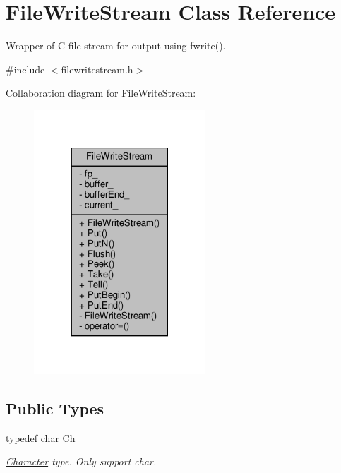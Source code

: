 \hypertarget{classFileWriteStream}{}\section{File\+Write\+Stream Class Reference}
\label{classFileWriteStream}


Wrapper of C file stream for output using fwrite().  




{\ttfamily \#include $<$filewritestream.\+h$>$}



Collaboration diagram for File\+Write\+Stream\+:
\nopagebreak
\begin{figure}[H]
\begin{center}
\leavevmode
\includegraphics[width=182pt]{classFileWriteStream__coll__graph}
\end{center}
\end{figure}
\subsection*{Public Types}
\begin{DoxyCompactItemize}
\item 
typedef char \hyperlink{classFileWriteStream_abc16aeb69ad4176263ddfcb837fb7b49}{Ch}
\begin{DoxyCompactList}\small\item\em \hyperlink{structCharacter}{Character} type. Only support char. \end{DoxyCompactList}\end{DoxyCompactItemize}
